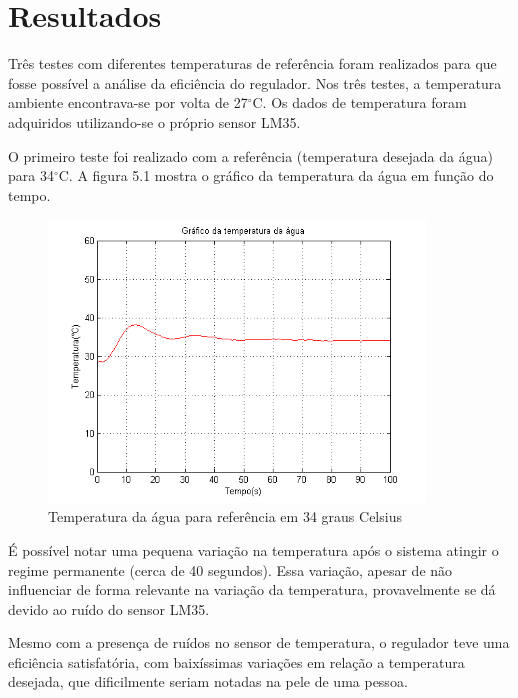 \chapter{Resultados}

Três testes com diferentes temperaturas de referência foram realizados para que fosse possível a análise da eficiência do regulador. Nos três testes, a temperatura ambiente encontrava-se por volta de 27$^{\circ}$C. Os dados de temperatura foram adquiridos utilizando-se o próprio sensor LM35.

    O primeiro teste foi realizado com a referência (temperatura desejada da água) para 34$^{\circ}$C. A figura 5.1 mostra o gráfico da temperatura da água em função do tempo.
    
\begin{figure}[H]

\center

\includegraphics[width=10cm]{imagens/grafico_34graus.png}

\label{Temperatura da água para referência em 34 graus Celsius}

\caption{Temperatura da água para referência em 34 graus Celsius}
\end{figure}
    
\noindent É possível notar uma pequena variação na temperatura após o sistema atingir o regime permanente (cerca de 40 segundos). Essa variação, apesar de não influenciar de forma relevante na variação da temperatura, provavelmente se dá devido ao ruído do sensor LM35. 

    Mesmo com a presença de ruídos no sensor de temperatura, o regulador teve uma eficiência satisfatória, com baixíssimas variações em relação a temperatura desejada, que dificilmente seriam notadas na pele de uma pessoa.

